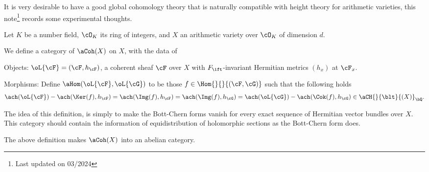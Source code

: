 \documentclass[article, a4paper, twoside]{universal}
\begin{document}
\confighead{}{}{}

It is very desirable to have a good global cohomology theory that is naturally compatible with height theory for arithmetic varieties, this note\footnote{Last updated on 03/2024} records some experimental thoughts.

\begin{stp}
	Let $K$ be a number field, $\cO_{K}$ its ring of integers, and $X$ an arithmetic variety over $\cO_{K}$ of dimension $d$.
\end{stp}

\begin{dfn}
	We define a category of  $\aCoh(X)$ on $X$, with the data of
	\begin{itm}
		\item Objects: $\oL{\cF}=(\cF,h_{\cF})$, a coherent sheaf $\cF$ over $X$ with $F_{\ift}$-invariant Hermitian metrics $(h_{x})$ at $\cF_{x}$.
		\item Morphisms: Define $\aHom(\oL{\cF},\oL{\cG})$ to be those $f\in\Hom{}{}{(\cF,\cG)}$ such that the following holds
		\[
			\ach(\oL{\cF})-\ach(\Ker(f),h_{\cF})=\ach(\Img(f),h_{\cF})=\ach(\Img(f),h_{\cG})=\ach(\oL{\cG})-\ach(\Cok(f),h_{\cG})\in\aCH{}{\blt}{(X)}_{\bQ}.
		\]
	\end{itm}
\end{dfn}

\begin{rmk}
	The idea of this definition, is simply to make the Bott-Chern forms \cite{BC1965} vanish for every exact sequence of Hermitian vector bundles over $X$. This category should contain the information of equidistribution of holomorphic sections as the Bott-Chern form does.

\end{rmk}



\begin{thm}
	The above definition makes $\aCoh(X)$ into an abelian category.
\end{thm}
\end{document}
